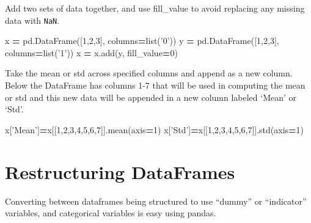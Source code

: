 \documentclass[]{book}
\newenvironment{Shaded}{\begin{snugshade}}{\end{snugshade}}
\newcommand{\BuiltInTok}[1]{#1}
\newcommand{\DecValTok}[1]{\textcolor[rgb]{0.00,0.00,0.81}{#1}}
\newcommand{\NormalTok}[1]{#1}
\newcommand{\OperatorTok}[1]{\textcolor[rgb]{0.81,0.36,0.00}{\textbf{#1}}}
\newcommand{\StringTok}[1]{\textcolor[rgb]{0.31,0.60,0.02}{#1}}
\begin{document}
Add two sets of data together, and use fill\_value to avoid replacing any missing data with \texttt{NaN}.

\begin{Shaded}
\begin{Highlighting}[]
\NormalTok{x }\OperatorTok{=}\NormalTok{ pd.DataFrame([}\DecValTok{1}\NormalTok{,}\DecValTok{2}\NormalTok{,}\DecValTok{3}\NormalTok{], columns}\OperatorTok{=}\BuiltInTok{list}\NormalTok{(}\StringTok{'0'}\NormalTok{))    }
\NormalTok{y }\OperatorTok{=}\NormalTok{ pd.DataFrame([}\DecValTok{1}\NormalTok{,}\DecValTok{2}\NormalTok{,}\DecValTok{3}\NormalTok{], columns}\OperatorTok{=}\BuiltInTok{list}\NormalTok{(}\StringTok{'1'}\NormalTok{))}
\NormalTok{x }\OperatorTok{=}\NormalTok{ x.add(y, fill_value}\OperatorTok{=}\DecValTok{0}\NormalTok{)}
\end{Highlighting}
\end{Shaded}

Take the mean or std across specified columns and append as a new column. Below the DataFrame has columns 1-7 that will be used in computing the mean or std and this new data will be appended in a new column labeled `Mean' or `Std'.

\begin{Shaded}
\begin{Highlighting}[]
\NormalTok{x[}\StringTok{'Mean'}\NormalTok{]}\OperatorTok{=}\NormalTok{x[[}\DecValTok{1}\NormalTok{,}\DecValTok{2}\NormalTok{,}\DecValTok{3}\NormalTok{,}\DecValTok{4}\NormalTok{,}\DecValTok{5}\NormalTok{,}\DecValTok{6}\NormalTok{,}\DecValTok{7}\NormalTok{]].mean(axis}\OperatorTok{=}\DecValTok{1}\NormalTok{)}
\NormalTok{x[}\StringTok{'Std'}\NormalTok{]}\OperatorTok{=}\NormalTok{x[[}\DecValTok{1}\NormalTok{,}\DecValTok{2}\NormalTok{,}\DecValTok{3}\NormalTok{,}\DecValTok{4}\NormalTok{,}\DecValTok{5}\NormalTok{,}\DecValTok{6}\NormalTok{,}\DecValTok{7}\NormalTok{]].std(axis}\OperatorTok{=}\DecValTok{1}\NormalTok{)}
\end{Highlighting}
\end{Shaded}

\hypertarget{restructuring-dataframes}{%
\section{Restructuring DataFrames}\label{restructuring-dataframes}}

Converting between dataframes being structured to use ``dummy'' or ``indicator'' variables, and categorical variables is easy using pandas.
\end{document}
